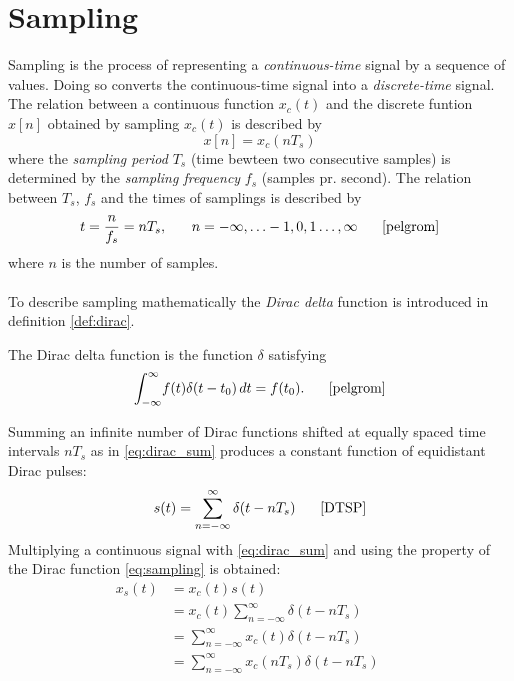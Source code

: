 \section{Sampling}
Sampling is the process of representing a \textit{continuous-time} signal by a sequence of values. Doing so converts the continuous-time signal into a \textit{discrete-time} signal. \cite{pelgrom} The relation between a continuous function $x_c(t)$ and the discrete funtion $x[n]$ obtained by sampling $x_c(t)$ is described by
\begin{equation}\label{eq:sampling_principle}
x[n]=x_c(nT_s)
\end{equation}
where the \textit{sampling period }$T_s$ (time bewteen two consecutive samples) is determined by the \textit{sampling frequency} $f_s$ (samples pr. second). The relation between $T_s$, $f_s$ and the times of samplings is described by
\begin{equation}\label{eq:sample_freq}
t=\frac{n}{f_s}=nT_s, \phantom{mm} n=-\infty,\hdots-1,0,1\hdots,\infty \phantom{mm}\text{\cite{pelgrom}}
\end{equation}
where $n$ is the number of samples.\\\\
To describe sampling mathematically the \textit{Dirac delta} function is introduced in definition \ref{def:dirac}.
\begin{definition}\label{def:dirac}
The Dirac delta function is the function $\delta$ satisfying
\begin{equation}
\int_{-\infty}^{\infty} \! f(t)\delta(t-t_0) \, dt=f(t_0).\phantom{mm}\text{\cite{pelgrom}}
\end{equation}
\end{definition}
Summing an infinite number of Dirac functions shifted at equally spaced time intervals $nT_s$ as in \eqref{eq:dirac_sum} produces a constant function of equidistant Dirac pulses:
\begin{equation}\label{eq:dirac_sum}
s(t)=\sum_{n=-\infty}^{\infty}\delta(t-nT_s)\phantom{mm}\text{\cite{DTSP}}
\end{equation}
Multiplying a continuous signal with \eqref{eq:dirac_sum} and using the property of the Dirac function \eqref{eq:sampling} is obtained:
\begin{align}
x_s(t)&=x_c(t)s(t)\nonumber \\
&=x_c(t)\sum_{n=-\infty}^{\infty}\delta(t - nT_s)\nonumber \\
&=\sum_{n=-\infty}^{\infty}x_c(t)\delta(t - nT_s)\nonumber\\
&=\sum_{n=-\infty}^{\infty}x_c(nT_s)\delta(t - nT_s)\phantom{mm}
\label{eq:sampling}
\end{align}
